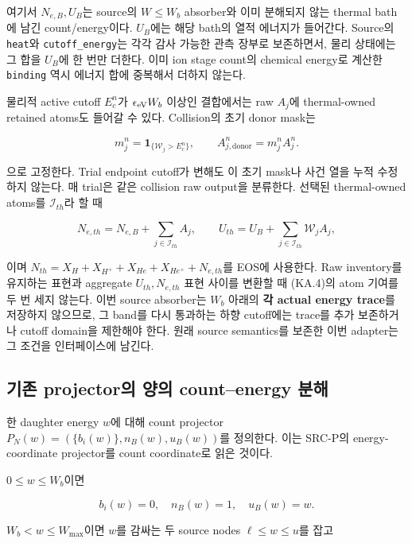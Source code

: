 여기서 \(N_{e,B},U_B\)는 source의 \(W\le W_b\) absorber와 이미 분해되지 않는 thermal bath에 남긴 count/energy이다. \(U_B\)에는 해당 bath의 열적 에너지가 들어간다. Source의 \texttt{heat}와 \texttt{cutoff\_energy}는 각각 감사 가능한 관측 장부로 보존하면서, 물리 상태에는 그 합을 \(U_B\)에 한 번만 더한다. 이미 ion stage count의 chemical energy로 계산한 \texttt{binding} 역시 에너지 합에 중복해서 더하지 않는다.

물리적 active cutoff \(E_c^n\)가 \(\epsilon_{\rm eV}W_b\) 이상인 결합에서는 raw \(A_j\)에 thermal-owned retained atoms도 들어갈 수 있다. Collision의 초기 donor mask는

\[
 m_j^n=\mathbf1_{\{\mathcal W_j>E_c^n\}},\qquad
 A_{j,\mathrm{donor}}^n=m_j^n A_j^n.
 \tag{KA.3}
\]

으로 고정한다. Trial endpoint cutoff가 변해도 이 초기 mask나 사건 열을 누적 수정하지 않는다. 매 trial은 같은 collision raw output을 분류한다. 선택된 thermal-owned atoms를 \(\mathcal I_{th}\)라 할 때

\[
 N_{e,th}=N_{e,B}+\sum_{j\in\mathcal I_{th}}A_j,\qquad
 U_{th}=U_B+\sum_{j\in\mathcal I_{th}}\mathcal W_jA_j,
 \tag{KA.4}
\]

이며 \(N_{th}=X_H+X_{H^+}+X_{He}+X_{He^+}+N_{e,th}\)를 EOS에 사용한다. Raw inventory를 유지하는 표현과 aggregate \(U_{th},N_{e,th}\) 표현 사이를 변환할 때 (KA.4)의 atom 기여를 두 번 세지 않는다. 이번 source absorber는 \(W_b\) 아래의 \textbf{각 actual energy trace}를 저장하지 않으므로, 그 band를 다시 통과하는 하향 cutoff에는 trace를 추가 보존하거나 cutoff domain을 제한해야 한다. 원래 source semantics를 보존한 이번 adapter는 그 조건을 인터페이스에 남긴다.

\hypertarget{uxae30uxc874-projectoruxc758-uxc591uxc758-countenergy-uxbd84uxd574}{%
\subsection{기존 projector의 양의 count--energy 분해}\label{uxae30uxc874-projectoruxc758-uxc591uxc758-countenergy-uxbd84uxd574}}

한 daughter energy \(w\)에 대해 count projector \(P_N(w)=(\{b_i(w)\},n_B(w),u_B(w))\)를 정의한다. 이는 SRC-P의 energy-coordinate projector를 count coordinate로 읽은 것이다.

\(0\le w\le W_b\)이면

\[
 b_i(w)=0,\quad n_B(w)=1,\quad u_B(w)=w.
 \tag{KA.5a}
\]

\(W_b<w\le W_{\max}\)이면 \(w\)를 감싸는 두 source nodes \(\ell\le w\le u\)를 잡고

